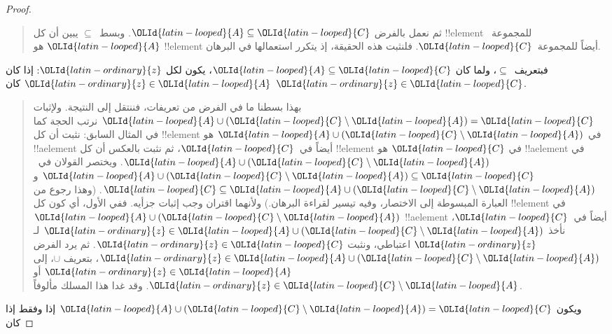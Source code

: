 \documentclass[../../../include/open-logic-section]{subfiles}
\begin{document}
\begin{proof}
\begin{quote}
    ثم نعمل بالفرض ${\OLId{latin-looped}{A}} \subseteq {\OLId{latin-looped}{C}}$. وبسط~$\subseteq$ يبين أن كل
    !!{element} للمجموعة~${\OLId{latin-looped}{A}}$ هو !!{element} أيضاً للمجموعة~${\OLId{latin-looped}{C}}$.
    فلنثبت هذه الحقيقة، إذ يتكرر استعمالها في البرهان.
  \end{quote}
  فبتعريف~$\subseteq$، ولما كان ${\OLId{latin-looped}{A}} \subseteq {\OLId{latin-looped}{C}}$، يكون لكل ${\OLId{latin-ordinary}{z}}$: إذا
  كان ${\OLId{latin-ordinary}{z}} \in {\OLId{latin-looped}{A}}$ كان ${\OLId{latin-ordinary}{z}} \in {\OLId{latin-looped}{C}}$.
  \begin{quote}
    بهذا بسطنا ما في الفرض من تعريفات، فننتقل إلى النتيجة. ولإثبات
    ${\OLId{latin-looped}{A}} \cup ({\OLId{latin-looped}{C}} \setminus {\OLId{latin-looped}{A}}) = {\OLId{latin-looped}{C}}$ نرتب الحجة كما في المثال السابق:
    نثبت أن كل !!{element} في ${\OLId{latin-looped}{A}} \cup ({\OLId{latin-looped}{C}} \setminus {\OLId{latin-looped}{A}})$ هو
    !!a{element} أيضاً في~${\OLId{latin-looped}{C}}$، ثم نثبت بالعكس أن كل !!{element} في
    ${\OLId{latin-looped}{C}}$ هو !!a{element} في ${\OLId{latin-looped}{A}} \cup ({\OLId{latin-looped}{C}} \setminus {\OLId{latin-looped}{A}})$. ويختصر القولان
    في~${\OLId{latin-looped}{A}} \cup ({\OLId{latin-looped}{C}} \setminus {\OLId{latin-looped}{A}}) \subseteq {\OLId{latin-looped}{C}}$ و
    ${\OLId{latin-looped}{C}} \subseteq {\OLId{latin-looped}{A}} \cup ({\OLId{latin-looped}{C}} \setminus {\OLId{latin-looped}{A}})$. (وهذا رجوع من العبارة
    المبسوطة إلى الاختصار، وفيه تيسير لقراءة البرهان.) ولأنهما اقتران
    وجب إثبات جزأيه. ففي الأول، أي كون كل !!{element} في
    ${\OLId{latin-looped}{A}} \cup ({\OLId{latin-looped}{C}} \setminus {\OLId{latin-looped}{A}})$ !!a{element} أيضاً في~${\OLId{latin-looped}{C}}$، نأخذ
    ${\OLId{latin-ordinary}{z}} \in {\OLId{latin-looped}{A}} \cup ({\OLId{latin-looped}{C}} \setminus {\OLId{latin-looped}{A}})$ لـ${\OLId{latin-ordinary}{z}}$ اعتباطي، ونثبت
    ${\OLId{latin-ordinary}{z}} \in {\OLId{latin-looped}{C}}$. ثم يرد الفرض ${\OLId{latin-ordinary}{z}} \in {\OLId{latin-looped}{A}} \cup ({\OLId{latin-looped}{C}} \setminus {\OLId{latin-looped}{A}})$، بتعريف
    $\cup$، إلى ${\OLId{latin-ordinary}{z}} \in {\OLId{latin-looped}{A}}$ أو
    ${\OLId{latin-ordinary}{z}} \in {\OLId{latin-looped}{C}} \setminus {\OLId{latin-looped}{A}}$. وقد غدا هذا المسلك مألوفاً.
    \end{quote}
  ويكون ${\OLId{latin-looped}{A}} \cup ({\OLId{latin-looped}{C}} \setminus {\OLId{latin-looped}{A}}) = {\OLId{latin-looped}{C}}$ إذا وفقط إذا كان

\end{proof}
\end{document}
